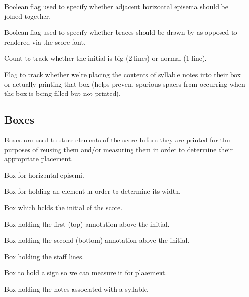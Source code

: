 Boolean flag used to specify whether adjacent horizontal episema should be joined together.

Boolean flag used to specify whether braces should be drawn by \MP{} as
opposed to rendered via the score font.

Count to track whether the initial is big (2-lines) or normal (1-line).

Flag to track whether we're placing the contents of syllable notes into their box or actually printing that box (helps prevent spurious spaces from occurring when the box is being filled but not printed).





\subsection{Boxes}

Boxes are used to store elements of the score before they are printed for the purposes of reusing them and/or measuring them in order to determine their appropriate placement.

Box for horizontal episemi.

Box for holding an element in order to determine its width.

Box which holds the initial of the score.

Box holding the first (top) annotation above the initial.

Box holding the second (bottom) annotation above the initial.

Box holding the staff lines.

Box to hold a sign so we can measure it for placement.

Box holding the notes associated with a syllable.

